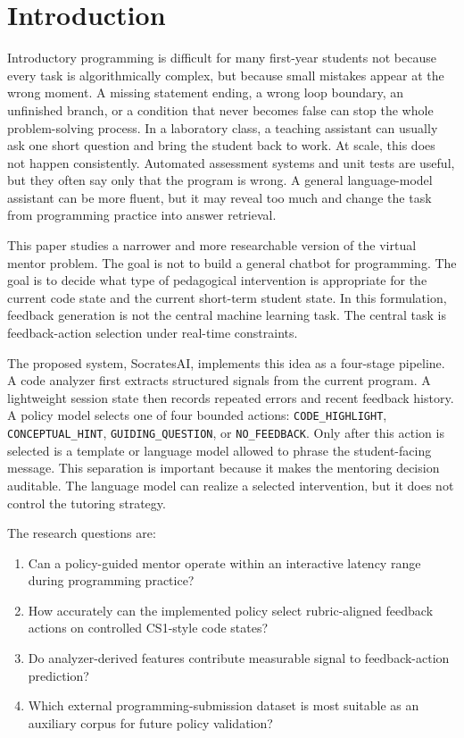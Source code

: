 \documentclass[twoside, 11pt]{article}
\begin{document}
\section{\large Introduction}

Introductory programming is difficult for many first-year students not because every task is algorithmically complex, but because small mistakes appear at the wrong moment. A missing statement ending, a wrong loop boundary, an unfinished branch, or a condition that never becomes false can stop the whole problem-solving process. In a laboratory class, a teaching assistant can usually ask one short question and bring the student back to work. At scale, this does not happen consistently. Automated assessment systems and unit tests are useful, but they often say only that the program is wrong. A general language-model assistant can be more fluent, but it may reveal too much and change the task from programming practice into answer retrieval.

This paper studies a narrower and more researchable version of the virtual mentor problem. The goal is not to build a general chatbot for programming. The goal is to decide what type of pedagogical intervention is appropriate for the current code state and the current short-term student state. In this formulation, feedback generation is not the central machine learning task. The central task is feedback-action selection under real-time constraints.

The proposed system, SocratesAI, implements this idea as a four-stage pipeline. A code analyzer first extracts structured signals from the current program. A lightweight session state then records repeated errors and recent feedback history. A policy model selects one of four bounded actions: \texttt{CODE\_HIGHLIGHT}, \texttt{CONCEPTUAL\_HINT}, \texttt{GUIDING\_QUESTION}, or \texttt{NO\_FEEDBACK}. Only after this action is selected is a template or language model allowed to phrase the student-facing message. This separation is important because it makes the mentoring decision auditable. The language model can realize a selected intervention, but it does not control the tutoring strategy.

The research questions are:
\begin{enumerate}
\item Can a policy-guided mentor operate within an interactive latency range during programming practice?
\item How accurately can the implemented policy select rubric-aligned feedback actions on controlled CS1-style code states?
\item Do analyzer-derived features contribute measurable signal to feedback-action prediction?
\item Which external programming-submission dataset is most suitable as an auxiliary corpus for future policy validation?
\end{enumerate}
\end{document}
